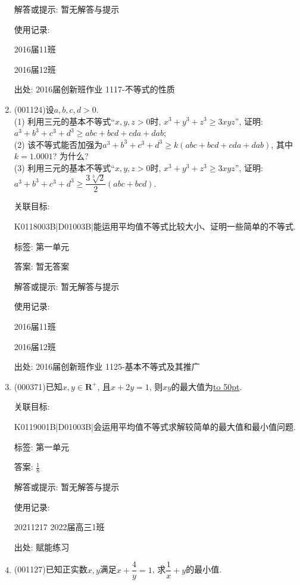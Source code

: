 \documentclass[10pt,a4paper]{article}
\newcommand{\blank}[1]{\underline{\hbox to #1pt{}}}
\begin{document}
\begin{enumerate}[1.]
解答或提示: 暂无解答与提示

使用记录:

2016届11班	

2016届12班	


出处: 2016届创新班作业	1117-不等式的性质
\item { (001124)}设$a,b,c,d>0$.\\ 
(1) 利用三元的基本不等式``$x,y,z>0$时, $x^3+y^3+z^3\ge 3xyz$'', 证明: $a^3+b^3+c^3+d^3\geq abc+bcd+cda+dab$;\\ 
(2) 该不等式能否加强为$a^3+b^3+c^3+d^3\ge k(abc+bcd+cda+dab)$, 其中$k=1.0001$? 为什么?\\ 
(3) 利用三元的基本不等式``$x,y,z>0$时, $x^3+y^3+z^3\ge 3xyz$'', 证明: $a^3+b^3+c^3+d^3\geq \dfrac{3\sqrt[3]{2}}{2}(abc+bcd)$.


关联目标:

K0118003B|D01003B|能运用平均值不等式比较大小、证明一些简单的不等式.



标签: 第一单元

答案: 暂无答案

解答或提示: 暂无解答与提示

使用记录:

2016届11班			

2016届12班			


出处: 2016届创新班作业	1125-基本不等式及其推广
\item { (000371)}已知$x,y\in \mathbf{R}^+$, 且$x+2y=1$, 则$xy$的最大值为\blank{50}.


关联目标:

K0119001B|D01003B|会运用平均值不等式求解较简单的最大值和最小值问题.



标签: 第一单元

答案: $\frac 18$

解答或提示: 暂无解答与提示

使用记录:

20211217	2022届高三1班	


出处: 赋能练习
\item { (001127)}已知正实数$x,y$满足$x+\dfrac{4}{y}=1$, 求$\dfrac{1}{x}+y$的最小值.



\end{enumerate}
\end{document}
